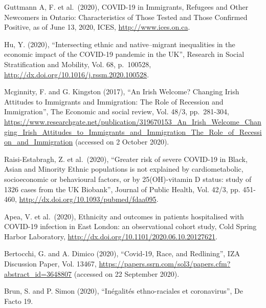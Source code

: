 \documentclass[
]{article}
\begin{document}
Guttmann A, F. et al.~(2020), COVID-19 in Immigrants, Refugees and Other
Newcomers in Ontario: Characteristics of Those Tested and Those Confirmed
Positive, as of June 13, 2020, ICES, \url{http://www.ices.on.ca}.

Hu, Y. (2020), ``Intersecting ethnic and native--migrant inequalities in the
economic impact of the COVID-19 pandemic in the UK'', Research in Social
Stratification and Mobility, Vol. 68, p.~100528,
\url{http://dx.doi.org/10.1016/j.rssm.2020.100528}.

Mcginnity, F. and G. Kingston (2017), ``An Irish Welcome? Changing Irish
Attitudes to Immigrants and Immigration: The Role of Recession and Immigration'',
The Economic and social review, Vol. 48/3, pp.~281-304,
\url{https://www.researchgate.net/publication/319670153_An_Irish_Welcome_Changing_Irish_Attitudes_to_Immigrants_and_Immigration_The_Role_of_Recession_and_Immigration}
(accessed on 2 October 2020).

Raisi-Estabragh, Z. et al.~(2020), ``Greater risk of severe COVID-19 in Black,
Asian and Minority Ethnic populations is not explained by cardiometabolic,
socioeconomic or behavioural factors, or by 25(OH)-vitamin D status: study of
1326 cases from the UK Biobank'', Journal of Public Health, Vol. 42/3, pp.
451-460, \url{http://dx.doi.org/10.1093/pubmed/fdaa095}.

Apea, V. et al.~(2020), Ethnicity and outcomes in patients hospitalised with
COVID-19 infection in East London: an observational cohort study, Cold Spring
Harbor Laboratory, \url{http://dx.doi.org/10.1101/2020.06.10.20127621}.

Bertocchi, G. and A. Dimico (2020), ``Covid-19, Race, and Redlining'', IZA
Discussion Paper, Vol. 13467,
\url{https://papers.ssrn.com/sol3/papers.cfm?abstract_id=3648807} (accessed on 22
September 2020).

Brun, S. and P. Simon (2020), ``Inégalités ethno-raciales et coronavirus'', De
Facto 19.
\end{document}
